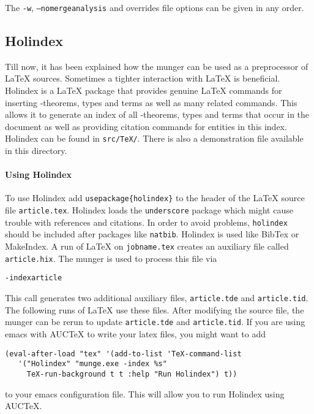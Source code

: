 \smallskip \noindent The \texttt{-w}, \texttt{--nomergeanalysis} and
overrides file options can be given in any order.

\subsection{Holindex}

Till now, it has been explained how the munger can be used as a preprocessor of \LaTeX{} sources.
Sometimes a tighter interaction with \LaTeX{} is beneficial.
Holindex is a \LaTeX{} package that provides genuine \LaTeX{} commands for inserting \HOL{}-theorems, types and terms as well as many related commands.
This allows it to generate an index of all \HOL{}-theorems, types and terms that occur in the document as well as providing citation commands for \HOL{} entities in this index.
Holindex can be found in \texttt{src/TeX/}.
There is also a demonstration file available in this directory.


\paragraph{Using Holindex}
To use Holindex add \texttt{\bs{}usepackage\{holindex\}} to the header
of the \LaTeX{} source file \texttt{article.tex}. Holindex loads the
\texttt{underscore} package which might cause trouble with references
and citations. In order to avoid problems,
\texttt{holindex} should be included after packages
like \texttt{natbib}. Holindex is used like BibTex or
MakeIndex. A run of \LaTeX{} on \texttt{jobname.tex} creates an
auxiliary file called \texttt{article.hix}. The munger is used to
process this file via
\begin{alltt}
   \munge -index article
\end{alltt}
This call generates two additional auxiliary files,
\texttt{article.tde} and \texttt{article.tid}.  The following runs of
\LaTeX{} use these files. After modifying the source file, the munger
can be rerun to update \texttt{article.tde} and \texttt{article.tid}.
If you are using emacs with AUCTeX to write your latex files, you might
want to add
\begin{verbatim}
(eval-after-load "tex" '(add-to-list 'TeX-command-list
   '("Holindex" "munge.exe -index %s"
     TeX-run-background t t :help "Run Holindex") t))
\end{verbatim}
to your emacs configuration file. This will allow
you to run Holindex using AUCTeX.

